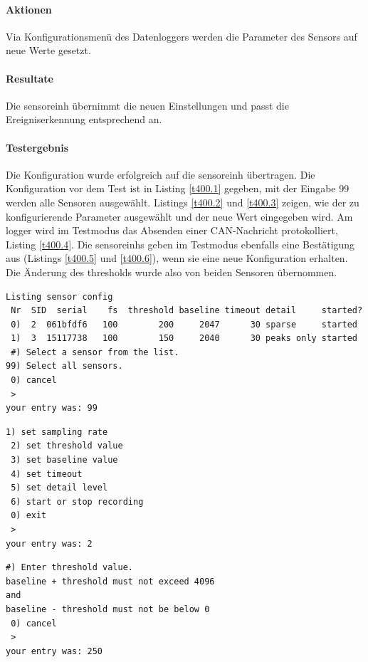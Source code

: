 \paragraph{Aktionen} Via Konfigurationsmenü des Datenloggers werden die Parameter des Sensors auf neue Werte gesetzt. 

\paragraph{Resultate} Die \gls{sensoreinh} übernimmt die neuen Einstellungen und passt die Ereigniserkennung entsprechend an.

\paragraph{Testergebnis} Die Konfiguration wurde erfolgreich auf die \gls{sensoreinh} übertragen. Die Konfiguration vor dem Test ist in Listing \ref{t400.1} gegeben, mit der Eingabe 99 werden alle Sensoren ausgewählt. Listings \ref{t400.2} und \ref{t400.3} zeigen, wie der zu konfigurierende Parameter ausgewählt und der neue Wert eingegeben wird. Am \gls{logger} wird im Testmodus das Absenden einer CAN-Nachricht protokolliert, Listing \ref{t400.4}. Die \glspl{sensoreinh} geben im Testmodus ebenfalls eine Bestätigung aus (Listings \ref{t400.5} und \ref{t400.6}), wenn sie eine neue Konfiguration erhalten. Die Änderung des \gls{threshold}s wurde also von beiden Sensoren übernommen.

\begin{lstlisting}[caption=T400 Vorbedingung und Auswahl aller Sensoren, label=t400.1]
Listing sensor config
 Nr  SID  serial    fs  threshold baseline timeout detail     started?
 0)  2  061bfdf6   100        200     2047      30 sparse     started
 1)  3  15117738   100        150     2040      30 peaks only started
 #) Select a sensor from the list.
99) Select all sensors.
 0) cancel
 >
your entry was: 99
\end{lstlisting}

\begin{lstlisting}[caption=T400 Auswahl des Parameters, label=t400.2]
 1) set sampling rate
 2) set threshold value
 3) set baseline value
 4) set timeout
 5) set detail level
 6) start or stop recording
 0) exit
 >
your entry was: 2
\end{lstlisting}

\begin{lstlisting}[caption=T400 Eingabe des neuen \gls{threshold}s, label=t400.3]
 #) Enter threshold value.
baseline + threshold must not exceed 4096
and
baseline - threshold must not be below 0
 0) cancel
 >
your entry was: 250
\end{lstlisting}

